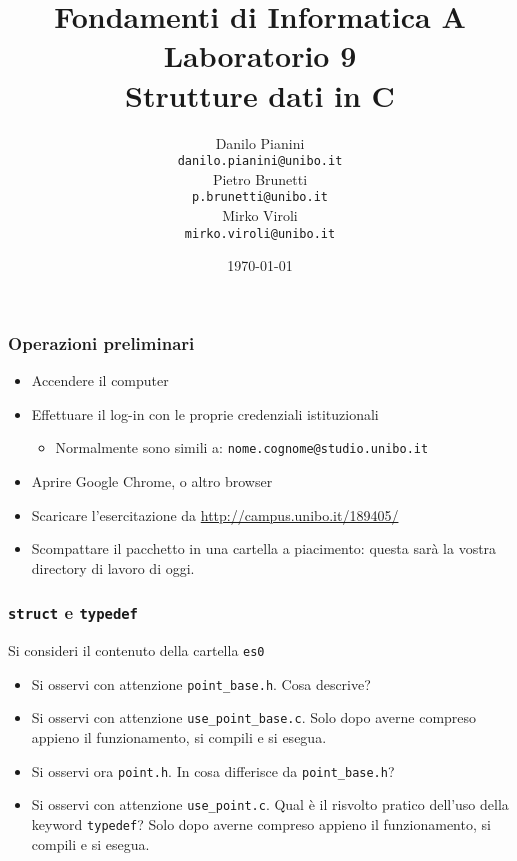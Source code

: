 \documentclass{beamer}
\begin{document}
\title[Lab1 - FV]{Fondamenti di Informatica A \\ Laboratorio 9 \\ Strutture dati in C}
\author[Danilo Pianini]{Danilo Pianini\\\texttt{danilo.pianini@unibo.it} \\ \vspace{3pt} Pietro Brunetti\\\texttt{p.brunetti@unibo.it} \\ \vspace{3pt} Mirko Viroli\\\texttt{mirko.viroli@unibo.it} }
\date[\today]{\today}

\frame{\titlepage} 

\begin{frame}[fragile]
\frametitle{Operazioni preliminari}
\begin{itemize}
 \item Accendere il computer
 \item Effettuare il log-in con le proprie credenziali istituzionali
  \begin{itemize}
    \item Normalmente sono simili a: \texttt{nome.cognome@studio.unibo.it}
  \end{itemize}
 \item Aprire Google Chrome, o altro browser
 \item Scaricare l'esercitazione da \url{http://campus.unibo.it/189405/}
 \item Scompattare il pacchetto in una cartella a piacimento: questa sarà la vostra directory di lavoro di oggi.
\end{itemize}
\end{frame}

\begin{frame}[fragile]
\frametitle{\texttt{struct} e \texttt{typedef}}
Si consideri il contenuto della cartella \texttt{es0}
\begin{itemize}
 \item Si osservi con attenzione \texttt{point\_base.h}. Cosa descrive?
 \item Si osservi con attenzione \texttt{use\_point\_base.c}. Solo dopo averne compreso appieno il funzionamento, si compili e si esegua.
 \item Si osservi ora \texttt{point.h}. In cosa differisce da \texttt{point\_base.h}?
 \item Si osservi con attenzione \texttt{use\_point.c}. Qual è il risvolto pratico dell'uso della keyword \texttt{typedef}? Solo dopo averne compreso appieno il funzionamento, si compili e si esegua.
\end{itemize}
\end{frame}
\end{document}
